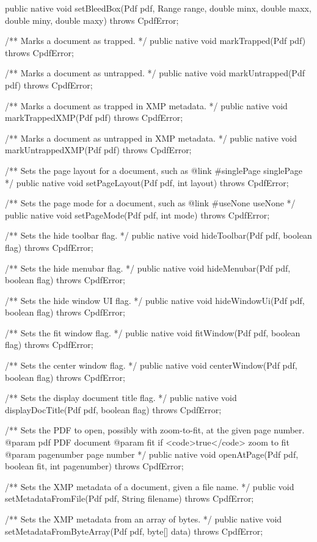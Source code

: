 public native void setBleedBox(Pdf pdf, Range range, double minx,
                               double maxx, double miny, double maxy)
    throws CpdfError;

/** Marks a document as trapped. */
public native void markTrapped(Pdf pdf) throws CpdfError;

/** Marks a document as untrapped. */
public native void markUntrapped(Pdf pdf) throws CpdfError;

/** Marks a document as trapped in XMP metadata. */
public native void markTrappedXMP(Pdf pdf) throws CpdfError;

/** Marks a document as untrapped in XMP metadata. */
public native void markUntrappedXMP(Pdf pdf) throws CpdfError;

/** Sets the page layout for a document, such as {@link #singlePage
singlePage} */
public native void setPageLayout(Pdf pdf, int layout) throws CpdfError;

/** Sets the page mode for a document, such as {@link #useNone useNone} */
public native void setPageMode(Pdf pdf, int mode) throws CpdfError;

/** Sets the hide toolbar flag. */
public native void hideToolbar(Pdf pdf, boolean flag) throws CpdfError;

/** Sets the hide menubar flag. */
public native void hideMenubar(Pdf pdf, boolean flag) throws CpdfError;

/** Sets the hide window UI flag. */
public native void hideWindowUi(Pdf pdf, boolean flag) throws CpdfError;

/** Sets the fit window flag. */
public native void fitWindow(Pdf pdf, boolean flag) throws CpdfError;

/** Sets the center window flag. */
public native void centerWindow(Pdf pdf, boolean flag) throws CpdfError;

/** Sets the display document title flag. */
public native void displayDocTitle(Pdf pdf, boolean flag) throws CpdfError;

/** Sets the PDF to open, possibly with zoom-to-fit, at the given page
number.
@param pdf PDF document
@param fit if <code>true</code> zoom to fit
@param pagenumber page number */
public native void openAtPage(Pdf pdf, boolean fit, int pagenumber)
    throws CpdfError;

/** Sets the XMP metadata of a document, given a file name. */
public void setMetadataFromFile(Pdf pdf, String filename) throws CpdfError;

/** Sets the XMP metadata from an array of bytes. */
public native void setMetadataFromByteArray(Pdf pdf, byte[] data)
    throws CpdfError;

